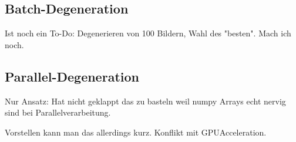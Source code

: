 \subsection{Batch-Degeneration}
Ist noch ein To-Do: Degenerieren von 100 Bildern, Wahl des "besten". Mach ich noch.
\subsection{Parallel-Degeneration}
Nur Ansatz: Hat nicht geklappt das zu basteln weil numpy Arrays echt nervig sind bei Parallelverarbeitung. 

Vorstellen kann man das allerdings kurz. Konflikt mit GPUAcceleration. 
